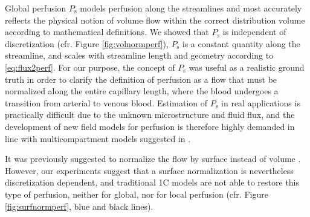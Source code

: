 \documentclass[aps,prb,article,groupedaddress,showkeys]{revtex4}
\begin{document}


	Global perfusion $P_{\mathrm{s}}$ models perfusion along the streamlines and most accurately reflects the physical notion of volume flow within the correct distribution volume according to mathematical definitions. We showed that $P_{\mathrm{s}}$ is independent of discretization (cfr. Figure \ref{fig:volnormperf}), $P_{\mathrm{s}}$ is a constant quantity along the streamline, and scales with streamline length and geometry according to \eqref{eq:flux2perf}.
	For our purpose, the concept of $P_{\mathrm{s}}$ was useful as a realistic ground truth in order to clarify the definition of perfusion as a flow that must be normalized along the entire capillary length, where the blood undergoes a transition from arterial to venous blood. Estimation of $P_{\mathrm{s}}$ in real applications is practically difficult due to the unknown microstructure and fluid flux, and the development of new field models for perfusion is therefore highly demanded in line with multicompartment models suggested in \cite{sourbron14,Michler2013}. 
	

It was previously suggested to normalize the flow by surface instead of volume \cite{Guibert2013}. However, our experiments suggest that a surface normalization is nevertheless discretization dependent, and traditional 1C models are not able to restore this type of perfusion, neither for global, nor for local perfusion (cfr. Figure \ref{fig:surfnormperf}, blue and black lines).
\end{document}
